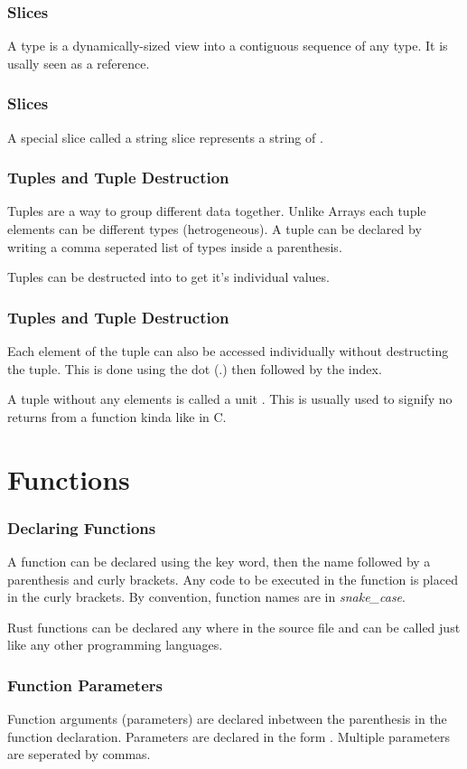 \documentclass{beamer}
\begin{document}
\begin{frame}
  \frametitle{Slices}
  A  type is a dynamically-sized view into a contiguous sequence of any type. It is usally seen as a reference.
  
\end{frame}

\begin{frame}
  \frametitle{Slices}
  A special slice called a string slice  represents a string of .
  
\end{frame}

\begin{frame}
  \frametitle{Tuples and Tuple Destruction}
  Tuples are a way to group different data together. Unlike Arrays each tuple elements can be different types (hetrogeneous). A tuple can be declared by writing a comma seperated list of types inside a parenthesis.
  
  Tuples can be destructed into to get it's individual values.
  
\end{frame}

\begin{frame}
  \frametitle{Tuples and Tuple Destruction}
  Each element of the tuple can also be accessed individually without destructing the tuple. This is done using the dot (.) then followed by the index.
  
  A tuple without any elements is called a unit \inlinecode{()}. This is usually used to signify no returns from a function kinda like  in C.
\end{frame}

\section{Functions}
\begin{frame}
  \frametitle{Declaring Functions}
  A function can be declared using the  key word, then the name followed by a parenthesis and curly brackets. Any code to be executed in the function is placed in the curly brackets. By convention, function names are in \emph{snake\_case}.
  
  Rust functions can be declared any where in the source file and can be called just like any other programming languages.
\end{frame}

\begin{frame}
  \frametitle{Function Parameters}
  Function arguments (parameters) are declared inbetween the parenthesis in the function declaration. Parameters are declared in the form . Multiple parameters are seperated by commas.
  
\end{frame}
\end{document}
